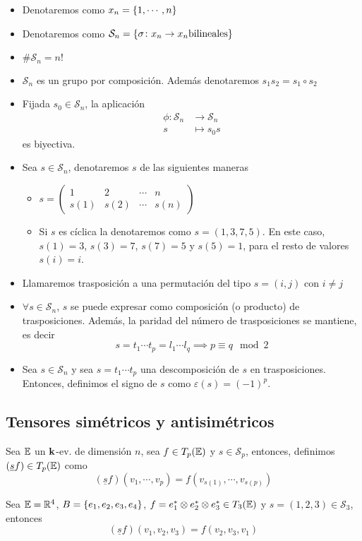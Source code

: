 \begin{itemize}
	\item Denotaremos como $x_n = \left\{1, \cdots, n\right\}$
	\item Denotaremos como $\mathcal{S}_n =\left\{\sigma\colon x_n \to
		x_n \text{bilineales}\right\}$
	\item $\#\mathcal{S}_n= n!$
	\item $\mathcal{S}_n$ es un grupo por composición. Además denotaremos
		$s_1 s_2 = s_1 \circ s_2$
	\item\label{obs:perm_biy} Fijada $s_0 \in \mathcal{S}_n$, la aplicación
		\[
			\begin{aligned}
				\phi \colon \mathcal{S}_n &\to \mathcal{S}_n \\
				s &\mapsto s_0s
			\end{aligned}
		\]
		es biyectiva.
	\item Sea $s \in \mathcal{S}_n$, denotaremos $s$  de las siguientes maneras
		\begin{itemize}
			\item $s = \begin{pmatrix}
				1 & 2 & \cdots & n \\
				s(1) & s(2) & \cdots & s(n)
			\end{pmatrix}$
			\item Si $s$ es cíclica la denotaremos como $s = (1,3,7,5)$. En este
			caso, $s(1)=3$, $s(3)=7$, $s(7)=5$ y $s(5)=1$, para el resto de valores
			$s(i)=i$.
		\end{itemize}
	\item Llamaremos trasposición a una permutación del tipo $s=(i,j)$ con
		$i \neq j$
	\item $\forall s \in \mathcal{S}_n$, $s$ se puede expresar como composición
		(o producto) de trasposiciones. Además, la paridad del número de
		trasposiciones se mantiene, es decir
		\[
			s = t_1 \cdots t_p = l_1 \cdots l_q \implies p \equiv q \mod 2
		\]
	\item Sea $s \in \mathcal{S}_n$ y sea $s=t_1 \cdots t_p$ una descomposición de
		$s$ en trasposiciones. Entonces, definimos el signo de $s$ como 
		$\varepsilon(s) = (-1)^p$.
\end{itemize}

\subsection{Tensores simétricos y antisimétricos}

\begin{defi}
	Sea $\mathbb{E}$ un $\mathbf{k}$-ev. de dimensión $n$, sea $f \in T_p(\mathbb{E})$ y $s \in\mathcal{S}_p$,
	entonces, definimos $(\underline{s}f) \in T_p(\mathbb{E})$ como
	\[
		(\underline{s}f)(v_1, \cdots, v_p) = f(v_{s(1)}, \cdots, v_{s(p)})
	\]
\end{defi}
\begin{example}
	Sea $\mathbb{E} = \mathbb{R}^4$, $B = \left\{e_1, e_2, e_3, e_4\right\}$, $f = e_1^* \otimes e_2^*
	\otimes e_3^* \in T_3(\mathbb{E})$ y $s = (1,2,3) \in \mathcal{S}_3$, entonces
	\[
		(\underline{s}f)(v_1,v_2,v_3) = f(v_2,v_3,v_1)
	\]
\end{example}

